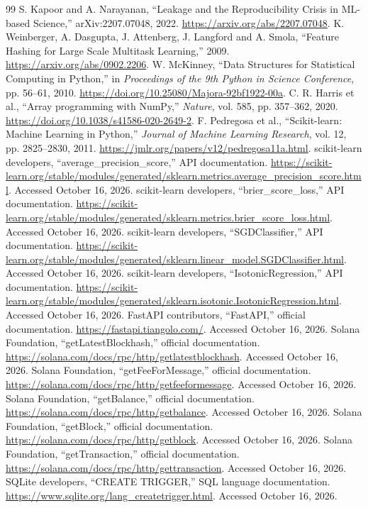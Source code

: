 \documentclass[12pt,a4paper,oneside]{report}
\begin{document}
\begin{thebibliography}{99}
 S. Kapoor and A. Narayanan, ``Leakage and the Reproducibility Crisis in ML-based Science,'' arXiv:2207.07048, 2022. \url{https://arxiv.org/abs/2207.07048}.
 K. Weinberger, A. Dasgupta, J. Attenberg, J. Langford and A. Smola, ``Feature Hashing for Large Scale Multitask Learning,'' 2009. \url{https://arxiv.org/abs/0902.2206}.
 W. McKinney, ``Data Structures for Statistical Computing in Python,'' in \emph{Proceedings of the 9th Python in Science Conference}, pp. 56--61, 2010. \url{https://doi.org/10.25080/Majora-92bf1922-00a}.
 C. R. Harris et al., ``Array programming with NumPy,'' \emph{Nature}, vol. 585, pp. 357--362, 2020. \url{https://doi.org/10.1038/s41586-020-2649-2}.
 F. Pedregosa et al., ``Scikit-learn: Machine Learning in Python,'' \emph{Journal of Machine Learning Research}, vol. 12, pp. 2825--2830, 2011. \url{https://jmlr.org/papers/v12/pedregosa11a.html}.
 scikit-learn developers, ``average\_precision\_score,'' API documentation. \url{https://scikit-learn.org/stable/modules/generated/sklearn.metrics.average_precision_score.html}. Accessed October 16, 2026.
 scikit-learn developers, ``brier\_score\_loss,'' API documentation. \url{https://scikit-learn.org/stable/modules/generated/sklearn.metrics.brier_score_loss.html}. Accessed October 16, 2026.
 scikit-learn developers, ``SGDClassifier,'' API documentation. \url{https://scikit-learn.org/stable/modules/generated/sklearn.linear_model.SGDClassifier.html}. Accessed October 16, 2026.
 scikit-learn developers, ``IsotonicRegression,'' API documentation. \url{https://scikit-learn.org/stable/modules/generated/sklearn.isotonic.IsotonicRegression.html}. Accessed October 16, 2026.
 FastAPI contributors, ``FastAPI,'' official documentation. \url{https://fastapi.tiangolo.com/}. Accessed October 16, 2026.
 Solana Foundation, ``getLatestBlockhash,'' official documentation. \url{https://solana.com/docs/rpc/http/getlatestblockhash}. Accessed October 16, 2026.
 Solana Foundation, ``getFeeForMessage,'' official documentation. \url{https://solana.com/docs/rpc/http/getfeeformessage}. Accessed October 16, 2026.
 Solana Foundation, ``getBalance,'' official documentation. \url{https://solana.com/docs/rpc/http/getbalance}. Accessed October 16, 2026.
 Solana Foundation, ``getBlock,'' official documentation. \url{https://solana.com/docs/rpc/http/getblock}. Accessed October 16, 2026.
 Solana Foundation, ``getTransaction,'' official documentation. \url{https://solana.com/docs/rpc/http/gettransaction}. Accessed October 16, 2026.
 SQLite developers, ``CREATE TRIGGER,'' SQL language documentation. \url{https://www.sqlite.org/lang_createtrigger.html}. Accessed October 16, 2026.
\end{thebibliography}
\endgroup
\appendix
\end{document}
